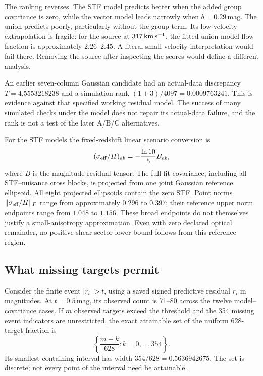 The ranking reverses. The STF model predicts better when the added group covariance is zero, while the vector model leads narrowly when $b=0.29\,\mathrm{mag}$. The union predicts poorly, particularly without the group term. Its low-velocity extrapolation is fragile: for the source at $317\,\mathrm{km}\,\mathrm{s}^{-1}$, the fitted union-model flow fraction is approximately $2.26$--$2.45$. A literal small-velocity interpretation would fail there. Removing the source after inspecting the scores would define a different analysis.

An earlier seven-column Gaussian candidate had an actual-data discrepancy $T=4.5553218238$ and a simulation rank $(1+3)/4097=0.0009763241$. This is evidence against that specified working residual model. The success of many simulated checks under the model does not repair its actual-data failure, and the rank is not a test of the later A/B/C alternatives.

For the STF models the fixed-redshift linear scenario conversion is
\begin{equation}
 (\sigma_{\rm eff}/H)_{ab}=-\frac{\ln10}{5}B_{ab},
 \label{eq:effectiveshear}
\end{equation}
where $B$ is the magnitude-residual tensor. The full fit covariance, including all STF--nuisance cross blocks, is projected from one joint Gaussian reference ellipsoid. All eight projected ellipsoids contain the zero STF. Point norms $\|\sigma_{\rm eff}/H\|_F$ range from approximately $0.296$ to $0.397$; their reference upper norm endpoints range from $1.048$ to $1.156$. These broad endpoints do not themselves justify a small-anisotropy approximation. Even with zero declared optical remainder, no positive shear-sector lower bound follows from this reference region.

\subsection{What missing targets permit}

Consider the finite event $|r_i|>t$, using a saved signed predictive residual $r_i$ in magnitudes. At $t=0.5\,\mathrm{mag}$, its observed count is 71--80 across the twelve model--covariance cases. If $m$ observed targets exceed the threshold and the 354 missing event indicators are unrestricted, the exact attainable set of the uniform 628-target fraction is
\begin{equation}
 \left\{\frac{m+k}{628}:k=0,\ldots,354\right\}.
 \label{eq:finiteidentified}
\end{equation}
Its smallest containing interval has width $354/628=0.5636942675$. The set is discrete; not every point of the interval need be attainable.

